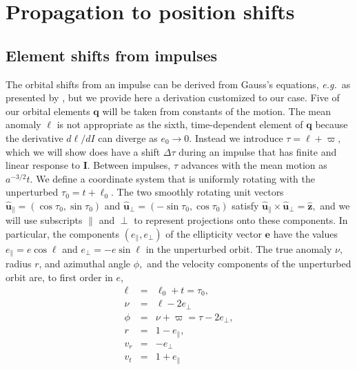 \documentclass[linenumbers, onecolumn]{aastex631}
\newcommand{\eg}{\textit{e.g.\/}}
\newcommand{\vecI}{\mathbf{I}}
\newcommand{\vece}{\mathbf{e}}
\newcommand{\uhat}{\boldsymbol{\hat u}}
\newcommand{\zhat}{\mathbf{\hat z}}
\newcommand{\vecq}{\mathbf{q}}
\newcommand{\lop}{\varpi}   %
\newcommand{\ma}{\ell}  %
\begin{document}
\section{Propagation to position shifts}
\label{sec:propagation}

\subsection{Element shifts from impulses}
\label{sec:elements}
The orbital shifts from an impulse can be derived from Gauss's
equations, \eg\ as presented by \citet[][Section 1.9.2]{tremaine}, but
we provide here a derivation customized to our case.
Five of our orbital elements $\vecq$ will be taken from constants of the motion.  The mean anomaly $\ma$ is not appropriate as the sixth, time-dependent element of $\vecq$ because the derivative $d\ma/dI$ can diverge as $e_0\rightarrow 0.$ Instead we introduce $\tau = \ma+\lop,$ which we will show does have a shift $\Delta\tau$ during an impulse that has finite and linear response to $\vecI$.  Between impulses, $\tau$ advances with the mean motion as $a^{-3/2}t.$  We define a coordinate system that is uniformly rotating with the unperturbed $\tau_0=t+\ma_0.$ The two smoothly rotating unit vectors $\uhat_\parallel=(\cos \tau_0, \sin \tau_0)$ and
$\uhat_\perp=(-\sin \tau_0, \cos \tau_0)$ satisfy $\uhat_\parallel
\times \uhat_\perp = \zhat,$ and we will use subscripts $\parallel$
and $\perp$ to represent projections onto these components.  In
particular, the components $(e_\parallel,e_\perp)$ of the ellipticity
vector $\vece$ have the values $e_\parallel=e\cos \ma$ and $e_\perp=-e\sin \ma$ in the unperturbed orbit.
The true anomaly $\nu,$ radius $r$, and azimuthal angle $\phi,$ and
the velocity components of the unperturbed orbit are, to first order in $e$,
\begin{eqnarray}
  \ma & = & \ma_0 + t = \tau_0,  \nonumber \\
  \nu & = & \ma - 2 e_\perp \nonumber \\
  \phi & = & \nu + \lop = \tau - 2e_\perp, \nonumber\\
  r & = & 1-e_\parallel, \nonumber \\
  v_r & = & -e_\perp \nonumber \\
  v_t & = & 1 + e_\parallel
            \label{eq:kepler}
\end{eqnarray}
\end{document}
